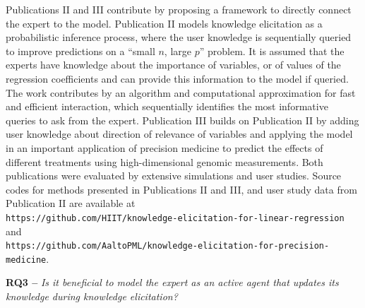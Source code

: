 \documentclass[dissertation,math,vertlayout,pdfa,colorlinks]{aaltoseries}
\begin{document}
Publications II and III contribute by proposing a framework to directly connect the expert to the model. Publication II models knowledge elicitation as a probabilistic inference process, where the user knowledge is sequentially queried to improve predictions on a ``small $n$, large $p$'' problem.  %
It is assumed that the experts have knowledge about the importance of variables, or of values of the regression coefficients and can provide this information to the model if queried. The work contributes by an algorithm and computational approximation for fast and efficient interaction, which sequentially identifies the most informative queries to ask from the expert. Publication III builds on Publication II by adding user knowledge about direction of relevance of variables and applying the model in an important application of precision medicine to predict the effects of different treatments using high-dimensional genomic measurements. Both publications were evaluated by extensive simulations and user studies. 
Source codes for methods presented in Publications II and III, and user study data from Publication II are available at \\ \texttt{https://github.com/HIIT/knowledge-elicitation-for-linear-regression} and \\ \texttt{https://github.com/AaltoPML/knowledge-elicitation-for-precision-medicine}.



\noindent \textbf{RQ3 --} \textit{Is it beneficial to model the expert as an active agent that updates its knowledge during knowledge elicitation?}
\end{document}
